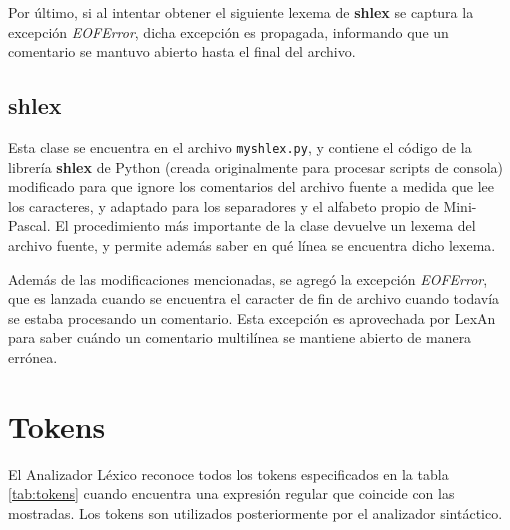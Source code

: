 \documentclass[a4paper,oneside]{report}
\begin{document}
Por último, si al intentar obtener el siguiente lexema de {\bf shlex} se captura la excepción \textit{EOFError}, dicha excepción es propagada, informando que un comentario se mantuvo abierto hasta el final del archivo.

\subsection{shlex}

Esta clase se encuentra en el archivo \texttt{myshlex.py}, y contiene el código de la librería {\bf shlex} de Python (creada originalmente para procesar scripts de consola) modificado para que ignore los comentarios del archivo fuente a medida que lee los caracteres, y adaptado para los separadores y el alfabeto propio de Mini-Pascal. El procedimiento más importante de la clase devuelve un lexema del archivo fuente, y permite además saber en qué línea se encuentra dicho lexema.

Además de las modificaciones mencionadas, se agregó la excepción \textit{EOFError}, que es lanzada cuando se encuentra el caracter de fin de archivo cuando todavía se estaba procesando un comentario. Esta excepción es aprovechada por LexAn para saber cuándo un comentario multilínea se mantiene abierto de manera errónea.

\section{Tokens}
El Analizador Léxico reconoce todos los tokens especificados en la tabla \ref{tab:tokens} cuando encuentra una expresión regular que coincide con las mostradas. Los tokens son utilizados posteriormente por el analizador sintáctico.
\end{document}
